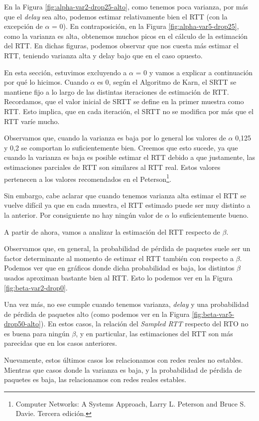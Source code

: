 En la Figura \ref{fig:alpha-var2-drop25-alto}, como tenemos poca varianza, por más que el \emph{delay} sea alto, podemos estimar relativamente bien el RTT (con la excepción de $\alpha$ = 0). En contraposición, en la Figura \ref{fig:alpha-var5-drop25}, como la varianza es alta, obtenemos  muchos picos en el cálculo de la estimación del RTT. En dichas figuras, podemos observar que nos cuesta más estimar el RTT, teniendo varianza alta y delay bajo que en el caso opuesto.

En esta sección, estuvimos excluyendo a $\alpha$ = 0 y vamos a explicar a continuación por qué lo hicimos. Cuando $\alpha$ es 0, según el Algoritmo de Karn, el SRTT se mantiene fijo a lo largo de las distintas iteraciones de estimación de RTT. Recordamos, que el valor inicial de SRTT se define en la primer muestra como RTT. Esto implica, que en cada iteración, el SRTT no se modifica por más que el RTT varíe mucho.

Observamos que, cuando la varianza es baja por lo general los valores de $\alpha$ 0,125 y 0,2 se comportan lo suficientemente bien. Creemos que esto sucede, ya que cuando la varianza es baja es posible estimar el RTT debido a que justamente, las estimaciones parciales de RTT son similares al RTT real. Estos valores pertenecen a los valores recomendados en el Peterson\footnote{Computer Networks: A Systems Approach, Larry L. Peterson and Bruce S. Davie. Tercera edición.}.

Sin embargo, cabe aclarar que cuando tenemos varianza alta estimar el RTT se vuelve difícil ya que en cada muestra, el RTT estimado puede ser muy distinto a la anterior. Por consiguiente no hay ningún valor de $\alpha$ lo suficientemente bueno.


A partir de ahora, vamos a analizar la estimación del RTT respecto de $\beta$.

Observamos que, en general, la probabilidad de pérdida de paquetes suele ser un factor determinante al momento de estimar el RTT también con respecto a $\beta$. Podemos ver que en gráficos donde dicha probabilidad es baja, los distintos $\beta$ usados aproximan bastante bien al RTT. Esto lo podemos ver en la Figura \ref{fig:beta-var2-drop0}.

Una vez más, no ese cumple cuando tenemos varianza, \emph{delay} y una probabilidad de pérdida de paquetes alto (como podemos ver en la Figura \ref{fig:beta-var5-drop50-alto}). En estos casos, la relación del \emph{Sampled RTT} respecto del RTO no es buena para ningún $\beta$, y en particular, las estimaciones del RTT son más parecidas que en los casos anteriores. 

Nuevamente, estos últimos casos los relacionamos con redes reales no estables. Mientras que casos donde la varianza es baja, y la probabilidad de pérdida de paquetes es baja, las relacionamos con redes reales estables.